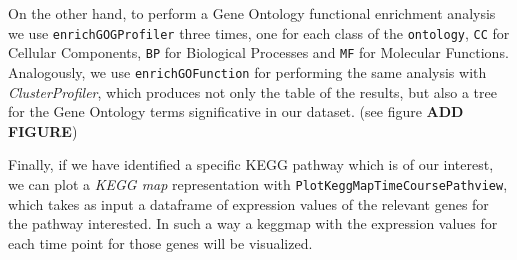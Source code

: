 On the other hand, to perform a Gene Ontology functional enrichment analysis we use \lstinline!enrichGOGProfiler! three times, one for each class of the \lstinline!ontology!, \lstinline!CC! for Cellular Components, \lstinline!BP! for Biological Processes and \lstinline!MF! for Molecular Functions.
Analogously, we use \lstinline!enrichGOFunction! for performing the same analysis with \textit{ClusterProfiler}, which produces not only the table of the results, but also a tree for the Gene Ontology terms significative in our dataset. (see figure \textbf{ADD FIGURE})

Finally, if we have identified a specific KEGG pathway which is of our interest, we can plot a \textit{KEGG map} representation with \lstinline!PlotKeggMapTimeCoursePathview!, which takes as input a dataframe of expression values of the relevant genes for the pathway interested.
In such a way a keggmap with the expression values for each time point for those genes will be visualized.




